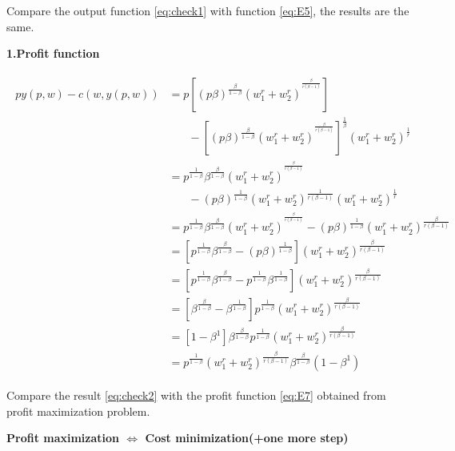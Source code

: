 \documentclass{article}
\begin{document}
Compare the output function \ref{eq:check1} with function \ref{eq:E5}, the results are the same.

\textbf{1.Profit function}

\begin{align}
\begin{split}
py(p,w) - c(w, y(p,w)) &= p[(p \beta)^{\frac{\beta}{1- \beta}} (w_1^r + w_2^r)^{^{\frac{\beta}{r(\beta - 1)}}}] \\ 
&\ \ \ \ \ \ \ \ - [(p \beta)^{\frac{\beta}{1- \beta}} (w_1^r + w_2^r)^{^{\frac{\beta}{r(\beta - 1)}}}]^{\frac{1}{\beta}}{(w_1^r + w_2^r)^{\frac{1}{r}}} \\
&= p^{\frac{1}{1- \beta}} \beta^{\frac{\beta}{1- \beta}}(w_1^r + w_2^r)^{^{\frac{\beta}{r(\beta - 1)}}} \\ 
&\ \ \ \ \ \ \ \ - (p\beta)^{\frac{1}{1- \beta}} (w_1^r + w_2^r)^{\frac{1}{r(\beta - 1)}}(w_1^r + w_2^r)^{\frac{1}{r}} \\
&= p^{\frac{1}{1- \beta}} \beta^{\frac{\beta}{1- \beta}}(w_1^r + w_2^r)^{^{\frac{\beta}{r(\beta - 1)}}} - (p\beta)^{\frac{1}{1- \beta}} (w_1^r + w_2^r)^{\frac{\beta}{r(\beta - 1)}} \\
&= [p^{\frac{1}{1- \beta}} \beta^{\frac{\beta}{1- \beta}} - (p\beta)^{\frac{1}{1- \beta}}] (w_1^r + w_2^r)^{\frac{\beta}{r(\beta - 1)}} \\
&= [p^{\frac{1}{1- \beta}} \beta^{\frac{\beta}{1- \beta}} - p^{\frac{1}{1- \beta}} \beta^{\frac{1}{1- \beta}}] (w_1^r + w_2^r)^{\frac{\beta}{r(\beta - 1)}} \\
&= [ \beta^{\frac{\beta}{1- \beta}} -\beta^{\frac{1}{1- \beta}}] p^{\frac{1}{1- \beta}}(w_1^r + w_2^r)^{\frac{\beta}{r(\beta - 1)}} \\
&= [ 1 -\beta^1] \beta^{\frac{\beta}{1- \beta}} p^{\frac{1}{1- \beta}}(w_1^r + w_2^r)^{\frac{\beta}{r(\beta - 1)}} \\
&= p^{\frac{1}{1- \beta}}(w_1^r + w_2^r)^{\frac{\beta}{r(\beta - 1)}} \beta^{\frac{\beta}{1- \beta}}(1 -\beta^1)
\end{split}
\label{eq:check2}   
\end{align}

Compare the result \ref{eq:check2} with the profit function \ref{eq:E7} obtained from profit maximization problem.

\begin{center}
\textbf{Profit maximization $\iff$  Cost minimization(+one more step)}
\end{center}

\end{document}
